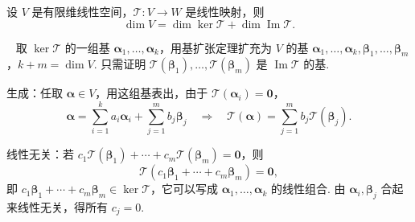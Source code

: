 \documentclass[lang=cn,10.5pt,scheme=chinese,toc=twocol,section,chinesefont=nofont,
twoside,citestyle=gb7714-2015,bibstyle=gb7714-2015]{elegantbook}
\newcommand{\vv}[1]{\boldsymbol{#1}}
\newcommand{\zero}{\boldsymbol{0}}          %
\numberwithin{equation}{section}   %
\newcommand{\imm}{\operatorname{Im}}        %
\newcommand*{\lnlabel}[1]{{\sffamily\bfseries\color{black}#1}}
\renewenvironment{proof}{%
	\par\noindent\lnlabel{\proofname}\;\ \color{black!90}\cfs}{\par}
\begin{document}
\begin{theorem}[秩—零化度定理]\label{thm:ranknullity}
  设 $V$ 是有限维线性空间，$\mathscr T:V\to W$ 是线性映射，则
  \[
    \dim V=\dim\ker\mathscr T+\dim\imm\mathscr T.
  \]
\end{theorem}
\begin{proof}
  取 $\ker\mathscr T$ 的一组基 $\vv\alpha_1,\ldots,\vv\alpha_k$，用基扩张定理扩充为 $V$ 的基 $\vv\alpha_1,\ldots,\vv\alpha_k,\vv\beta_1,\ldots,\vv\beta_{m}$，$k+m=\dim V$. 只需证明 $\mathscr T(\vv\beta_1),\ldots,\mathscr T(\vv\beta_m)$ 是 $\imm\mathscr T$ 的基.

  生成：任取 $\vv\alpha\in V$，用这组基表出，由于 $\mathscr T(\vv\alpha_i)=\zero$，
  \[\vv\alpha=\sum_{i=1}^k a_i\vv\alpha_i+\sum_{j=1}^m b_j\vv\beta_j\quad\Longrightarrow\quad\mathscr T(\vv\alpha)=\sum_{j=1}^m b_j\mathscr T(\vv\beta_j).\]

  线性无关：若 $c_1\mathscr T(\vv\beta_1)+\cdots+c_m\mathscr T(\vv\beta_m)=\zero$，则
  \[\mathscr T(c_1\vv\beta_1+\cdots+c_m\vv\beta_m)=\zero,\]
  即 $c_1\vv\beta_1+\cdots+c_m\vv\beta_m\in\ker\mathscr T$，它可以写成 $\vv\alpha_1,\ldots,\vv\alpha_k$ 的线性组合. 由 $\vv\alpha_i,\vv\beta_j$ 合起来线性无关，得所有 $c_j=0$.
\end{proof}
\end{document}
